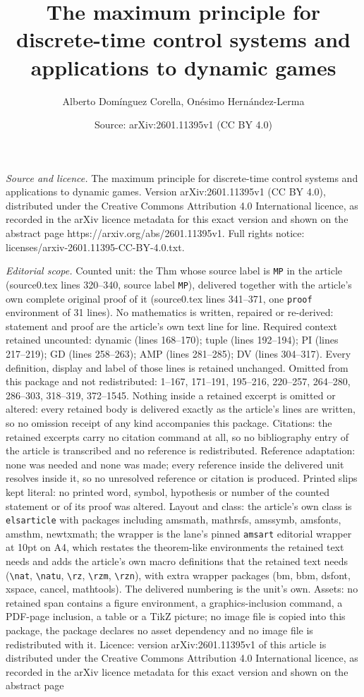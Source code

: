 \documentclass[10pt,a4paper]{amsart}
\title[The maximum principle for discrete-time control systems and ]{The maximum principle for discrete-time control systems and applications to dynamic games}
\author{Alberto Dom\'inguez Corella, On\'esimo Hern\'andez-Lerma}
\date{Source: arXiv:2601.11395v1 (CC BY 4.0)}
\begin{document}
\maketitle

\noindent\emph{Source and licence.} The maximum principle for discrete-time control systems and applications to dynamic games. Version arXiv:2601.11395v1 (CC BY 4.0), distributed under the Creative Commons Attribution 4.0 International licence, as recorded in the arXiv licence metadata for this exact version and shown on the abstract page https://arxiv.org/abs/2601.11395v1. Full rights notice: licenses/arxiv-2601.11395-CC-BY-4.0.txt.\par\smallskip

\noindent\textit{Editorial scope.} Counted unit: the Thm whose source label is \texttt{MP} in the article (source0.tex lines 320--340, source label \texttt{MP}), delivered together with the article's own complete original proof of it (source0.tex lines 341--371, one \texttt{proof} environment of 31 lines). No mathematics is written, repaired or re-derived: statement and proof are the article's own text line for line. Required context retained uncounted: dynamic (lines 168--170); tuple (lines 192--194); PI (lines 217--219); GD (lines 258--263); AMP (lines 281--285); DV (lines 304--317). Every definition, display and label of those lines is retained unchanged. Omitted from this package and not redistributed: 1--167, 171--191, 195--216, 220--257, 264--280, 286--303, 318--319, 372--1545. Nothing inside a retained excerpt is omitted or altered: every retained body is delivered exactly as the article's lines are written, so no omission receipt of any kind accompanies this package. Citations: the retained excerpts carry no citation command at all, so no bibliography entry of the article is transcribed and no reference is redistributed. Reference adaptation: none was needed and none was made; every reference inside the delivered unit resolves inside it, so no unresolved reference or citation is produced. Printed slips kept literal: no printed word, symbol, hypothesis or number of the counted statement or of its proof was altered. Layout and class: the article's own class is \texttt{elsarticle} with packages including amsmath, mathrsfs, amssymb, amsfonts, amsthm, newtxmath; the wrapper is the lane's pinned \texttt{amsart} editorial wrapper at 10pt on A4, which restates the theorem-like environments the retained text needs and adds the article's own macro definitions that the retained text needs (\texttt{\textbackslash nat}, \texttt{\textbackslash natu}, \texttt{\textbackslash rz}, \texttt{\textbackslash rzm}, \texttt{\textbackslash rzn}), with extra wrapper packages (bm, bbm, dsfont, xspace, cancel, mathtools). The delivered numbering is the unit's own. Assets: no retained span contains a figure environment, a graphics-inclusion command, a PDF-page inclusion, a table or a TikZ picture; no image file is copied into this package, the package declares no asset dependency and no image file is redistributed with it. Licence: version arXiv:2601.11395v1 of this article is distributed under the Creative Commons Attribution 4.0 International licence, as recorded in the arXiv licence metadata for this exact version and shown on the abstract page 
\end{document}

